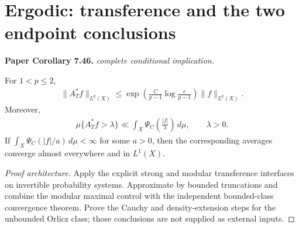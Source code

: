 \section{Ergodic: transference and the two endpoint conclusions}

\begin{lemma}
\label{ergodic_orlicz}
\leanok
\par\medskip\noindent\textbf{Paper Corollary 7.46.} \textit{complete conditional implication.}\par
For \(1<p\leq2\),
\begin{align}
 \|A_T^*f\|_{L^p(X)}
 \leq
 \exp\left(
 \frac{C}{p-1}\log\frac{e}{p-1}
 \right)\|f\|_{L^p(X)}.
\end{align}
Moreover,
\begin{align}
 \mu\{A_T^*f>\lambda\}
 \ll
 \int_X\Psi_C\left(\frac{|f|}{\lambda}\right)\,d\mu,
 \qquad \lambda>0.
\end{align}
If $ \int_X\Psi_C(|f|/a)\,d\mu<\infty$
for some \(a>0\), then the corresponding averages converge almost
everywhere and in \(L^1(X)\).
\end{lemma}
\begin{proof}[Proof architecture]
\leanok
Apply the explicit strong and modular transference interfaces on invertible probability systems. Approximate by bounded truncations and combine the modular maximal control with the independent bounded-class convergence theorem. Prove the Cauchy and density-extension steps for the unbounded Orlicz class; those conclusions are not supplied as external inputs.
\end{proof}

